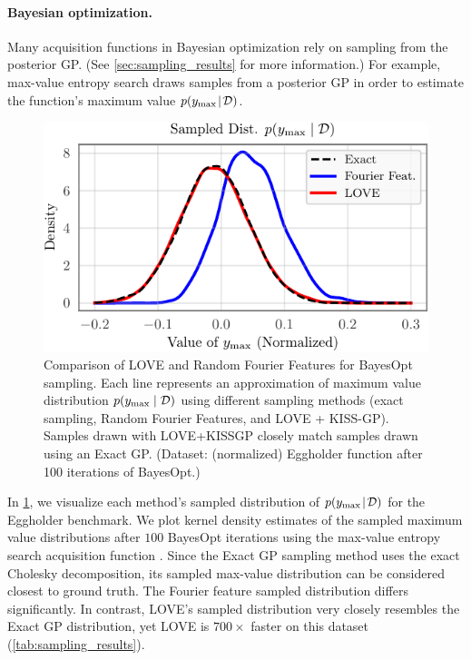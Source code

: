 \paragraph{Bayesian optimization.}
Many acquisition functions in Bayesian optimization rely on sampling from the posterior GP.
(See \cref{sec:sampling_results} for more information.)
For example, max-value entropy search \cite{wang2017max} draws samples from a posterior GP in order to estimate the function's maximum value $p(y_\text{max} \! \mid \! \mathcal D)$.
%
\begin{figure}[t!]
  \centering
  \includegraphics[width=0.70\columnwidth]{figures/love_sampling_comparison.pdf}
  \caption[Comparison of LOVE and Random Fourier Features for BayesOpt sampling.]{
    Comparison of LOVE and Random Fourier Features for BayesOpt sampling.
    Each line represents an approximation of maximum value distribution $p(y_\text{max} \mid \mathcal D)$ using different sampling methods (exact sampling, Random Fourier Features, and LOVE + KISS-GP).
    Samples drawn with LOVE+KISSGP closely match samples drawn using an Exact GP.
    (Dataset: (normalized) Eggholder function after 100 iterations of BayesOpt.)
    \label{fig:love_sampling_comparison}
  }
\end{figure}
%
In \cref{fig:love_sampling_comparison}, we visualize each method's sampled distribution of $p(y_\text{max} \! \mid \! \mathcal D)$ for the Eggholder benchmark.
We plot kernel density estimates of the sampled maximum value distributions after $100$ BayesOpt iterations using the max-value entropy search acquisition function \citep{wang2017max}.
Since the Exact GP sampling method uses the exact Cholesky decomposition, its sampled max-value distribution can be considered closest to ground truth.
The Fourier feature sampled distribution differs significantly.
In contrast, LOVE{}'s sampled distribution very closely resembles the Exact GP distribution, yet
LOVE{} is $700 \times$ faster on this dataset (\cref{tab:sampling_results}).
